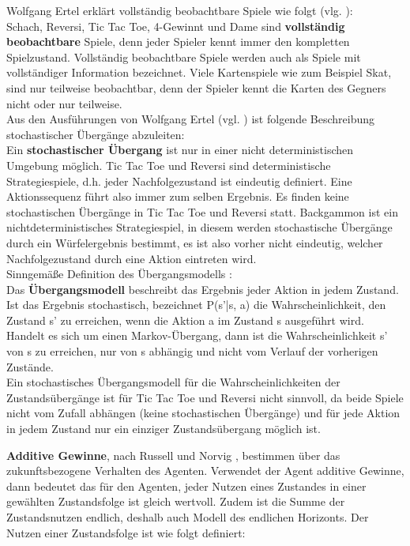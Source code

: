 Wolfgang Ertel erklärt vollständig beobachtbare Spiele wie folgt (vlg. \cite[114]{Ertel}):\\
Schach, Reversi, Tic Tac Toe, 4-Gewinnt und Dame sind \textbf{vollständig beobachtbare} Spiele, denn jeder Spieler kennt immer den kompletten Spielzustand. Vollständig beobachtbare Spiele werden auch als Spiele mit vollständiger Information bezeichnet. Viele Kartenspiele wie zum Beispiel Skat, sind nur teilweise beobachtbar, denn der Spieler kennt die Karten des Gegners nicht oder nur teilweise.\\

Aus den Ausführungen von Wolfgang Ertel (vgl. \cite[114]{Ertel}) ist folgende Beschreibung stochastischer Übergänge abzuleiten: \\
Ein \textbf{stochastischer Übergang} ist nur in einer nicht deterministischen Umgebung möglich.  Tic Tac Toe und Reversi sind deterministische Strategiespiele, d.h. jeder Nachfolgezustand ist eindeutig definiert. Eine Aktionssequenz führt also immer zum selben Ergebnis. Es finden keine stochastischen Übergänge in Tic Tac Toe und Reversi statt. Backgammon ist ein nichtdeterministisches Strategiespiel, in diesem werden stochastische Übergänge durch ein Würfelergebnis bestimmt, es ist also vorher nicht eindeutig, welcher Nachfolgezustand durch eine Aktion eintreten wird. \\

Sinngemäße Definition des Übergangsmodells \cite[753]{Russell}: \\
Das \textbf{Übergangsmodell} beschreibt das Ergebnis jeder Aktion in jedem Zustand. Ist das Ergebnis stochastisch, bezeichnet P(s'|s, a) die Wahrscheinlichkeit, den Zustand s' zu erreichen, wenn die Aktion a im Zustand s ausgeführt wird. Handelt es sich um einen Markov-Übergang, dann ist die Wahrscheinlichkeit s' von s zu erreichen, nur von s abhängig und nicht vom Verlauf der vorherigen Zustände. \\

Ein stochastisches Übergangsmodell für die Wahrscheinlichkeiten der Zustandsübergänge ist für Tic Tac Toe und Reversi nicht sinnvoll, da beide Spiele nicht vom Zufall abhängen (keine stochastischen Übergänge) und für jede Aktion in jedem Zustand nur ein einziger Zustandsübergang möglich ist. \newpage

\textbf{Additive Gewinne}, nach Russell und Norvig \cite[756]{Russell}, bestimmen über das zukunftsbezogene Verhalten des Agenten. Verwendet der Agent additive Gewinne, dann bedeutet das für den Agenten, jeder Nutzen eines Zustandes in einer gewählten Zustandsfolge ist gleich wertvoll. Zudem ist die Summe der Zustandsnutzen endlich, deshalb auch Modell des endlichen Horizonts. Der Nutzen einer Zustandsfolge ist wie folgt definiert: \\

